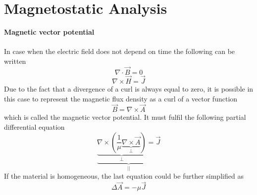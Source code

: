 \section{Magnetostatic Analysis}

\textbf{Magnetic vector potential \\ \\}
In case when the electric field does not depend on time the following can be written
\begin{equation*}
	\nabla \cdot \vec{B} = 0
\end{equation*}
\begin{equation*}
	\nabla \times \vec{H} = \vec{J}
\end{equation*}
Due to the fact that a divergence of a curl is always equal to zero, it is possible in this case to represent the magnetic flux density as a curl of a vector function 
\begin{equation*}
	\vec{B} = \nabla \times \vec{A}
\end{equation*}
which is called the magnetic vector potential. It must fulfil the following partial differential equation
\begin{equation*}
	\underbrace{\underbrace{\nabla \times \left(\frac{1}{\mu}\underbrace{\nabla \times \vec{A}}_{\bot}\right)}_{\bot} = \vec{J}}_{||}
\end{equation*}
If the material is homogeneous, the last equation could be further simplified as 
\begin{equation*}
	\Delta\vec{A} = -\mu \vec{J}
\end{equation*}

